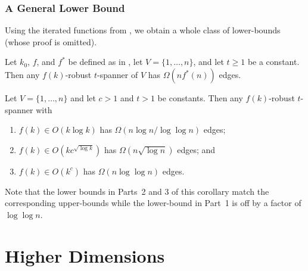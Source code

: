 \documentclass{cccg12}
\begin{document}
\subsubsection{A General Lower Bound}

Using the iterated functions from , we obtain a whole
class of lower-bounds (whose proof is omitted).

\begin{thm}
  Let $k_0$, $f$, and $f^*$ be defined as in ,
  let $V=\{1,\ldots,n\}$, and let $t\ge 1$ be a constant.  Then any
  $f(k)$-robust $t$-spanner of $V$ has $\Omega(nf^*(n))$ edges.
\end{thm}


\begin{cor}
  Let $V=\{1,\ldots,n\}$ and let $c>1$ and $t>1$ be constants.  Then any
  $f(k)$-robust $t$-spanner with
  \begin{enumerate}
    \item $f(k)\in O(k\log k)$ has $\Omega(n\log n/\log\log n)$ edges;
    \item $f(k)\in O(kc^{\sqrt{\log k}})$ has $\Omega(n\sqrt{\log n})$
      edges; and
    \item $f(k)\in O(k^{c})$ has $\Omega(n\log\log n)$ edges.
  \end{enumerate}
\end{cor}

Note that the lower bounds in Parts~2 and 3 of this corollary match the
corresponding upper-bounds while the lower-bound in Part~1 is off by a
factor of $\log\log n$.


\section{Higher Dimensions}
\end{document}
